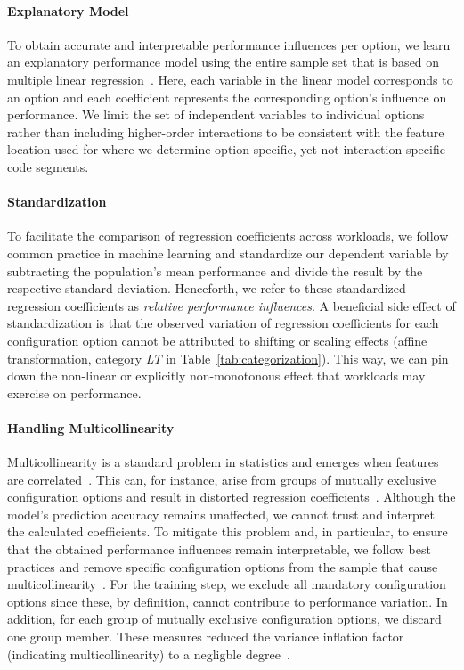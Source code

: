 {{{\paragraph*{Explanatory Model}
To obtain accurate and interpretable performance influences per option, we learn an explanatory performance model using the entire sample set that is based on multiple linear regression~\cite{dorn2020,siegmundPerformanceinfluenceModelsHighly2015,perLasso}. Here, each variable in the linear model corresponds to an option and each coefficient represents the corresponding option's influence on performance. 
We limit the set of independent variables to individual options rather than including higher-order interactions to be consistent with the feature location used for  where we determine option-specific, yet not interaction-specific code segments.
\paragraph*{Standardization}
To facilitate the comparison of regression coefficients across workloads, we follow common practice in machine learning and standardize our dependent variable by subtracting the population’s mean performance and divide the result by the respective standard deviation. Henceforth, we refer to these standardized regression coefficients as \textit{relative performance influences}. A beneficial side effect of standardization is that the observed variation of regression coefficients for each configuration option cannot be attributed to shifting or scaling effects (affine transformation, category \colorbox{lt-color}{\textit{LT}} in Table~\ref{tab:categorization}). This way, we can pin down  the non-linear or explicitly non-monotonous effect that workloads may exercise on performance.
\paragraph*{Handling Multicollinearity} Multicollinearity is a standard problem in statistics and emerges when features are correlated~\cite{Daoud_2017}. This can, for instance, arise from groups of mutually exclusive configuration options and result in distorted regression coefficients~\cite{dorn2020}. Although the model's prediction accuracy remains unaffected, we cannot trust and interpret the calculated coefficients. To mitigate this problem and, in particular, to ensure that the obtained performance influences remain interpretable, we follow best practices and remove specific configuration options from the sample that cause multicollinearity~\cite{dorn2020}. For the training step, we exclude all mandatory configuration options since these, by definition, cannot contribute to performance variation. In addition, for each group of mutually exclusive configuration options, we discard one group member. These measures reduced the variance inflation factor (indicating multicollinearity) to a negligble degree~\cite{o2007caution}.

}}}
